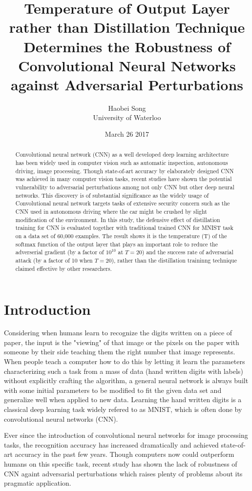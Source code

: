 \documentclass{article}
\title{\textbf{Temperature of Output Layer rather than Distillation Technique Determines the Robustness of Convolutional Neural Networks against Adversarial Perturbations}}
\author{Haobei Song \\
        University of Waterloo}
\date{March 26 2017}
\begin{document}
\maketitle
{}
\newpage
{}

\begin{abstract}
	Convolutional neural network (CNN) as a well developed deep learning architecture has been widely used in computer vision such as automatic inspection, autonomous driving, image processing. 
	Though state-of-art accuracy by elaborately designed CNN was achieved in many computer vision tasks, 
	recent studies have shown the potential vulnerability to adversarial perturbations among not only CNN but other deep neural networks.
	This discovery is of substantial significance as the widely usage of Convolutional neural network targets tasks of extensive security concern
	such as the CNN used in autonomous driving where the car might be crushed by slight modification of the environment. 
	In this study, the defensive effect of distillation training for CNN is evaluated together with traditional trained CNN for MNIST task on a data set of 60,000 examples.
	The result shows it is the temperature (T) of the softmax function of the output layer that plays an important role to reduce the adverserial gradient (by a factor of $10^{10}$ at $T=20$) and the success rate of adversarial attack (by a factor of 10 when $T=20$),
 rather than the distillation traininng technique claimed effective by other researchers.
\end{abstract}
\section{Introduction}
Considering when humans learn to recognize the digits written on a piece of paper, the input is the "viewing" of that image or the pixels on the paper with someone by their side teaching them the right number that image represents.
When people teach a computer how to do this by letting it learn the parameters characterizing such a task from a mass of data (hand written digits with labels) without explicitly crafting the algorithm, 
a general neural network is always built with some initial parameters to be modified to fit the given data set and generalize well when applied to new data. Learning the hand written digits is a classical deep learning task widely refered to as MNIST, which is often done by convolutional neural networks (CNN).

Ever since the introduction of convolutional neural networks for image processing tasks, the recognition accuracy has increased dramatically and achieved state-of-art accuracy in the past few years. Though computers now could outperform humans on this specific task,
recent study has shown the lack of robustness of CNN againt adversarial perturbations which raises plenty of problems about its pragmatic application. 
\end{document}
